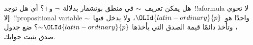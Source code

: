 \documentclass[../../../include/open-logic-section]{subfiles}
\begin{document}
\begin{prob}
  هل يمكن تعريف~$\sim$ في منطق بوتشفار بدلالة~$\lnot$ و$+$؟ أي هل
  توجد~!!a{formula} لا تحوي إلا~!!{propositional variable} واحدًا
  هو~$\OLId{latin-ordinary}{p}$، ولا يدخل فيها~$\sim$، وتأخذ دائمًا قيمة الصدق التي يأخذها
  $\mathord{\sim}\OLId{latin-ordinary}{p}$؟ ضع جدول صدق يثبت جوابك.
\end{prob}
\end{document}
